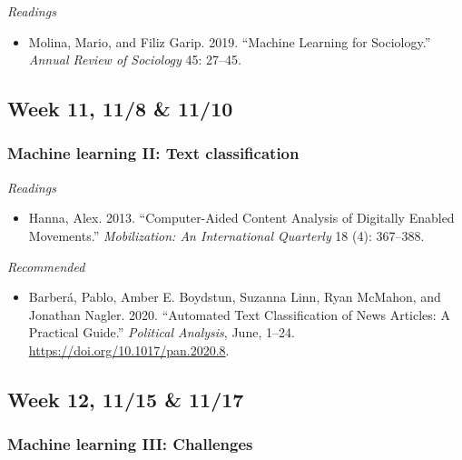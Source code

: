 \documentclass[
  10pt,
]{article}
\providecommand{\tightlist}{%
  \setlength{\itemsep}{0pt}\setlength{\parskip}{0pt}}
\begin{document}
\emph{Readings}

\begin{itemize}
\tightlist
\item
  Molina, Mario, and Filiz Garip. 2019. ``Machine Learning for
  Sociology.'' \emph{Annual Review of Sociology} 45: 27--45.
\end{itemize}

\hypertarget{week-11-118-1110}{%
\subsection{Week 11, 11/8 \& 11/10}\label{week-11-118-1110}}

\hypertarget{machine-learning-ii-text-classification}{%
\subsubsection{Machine learning II: Text
classification}\label{machine-learning-ii-text-classification}}

\emph{Readings}

\begin{itemize}
\tightlist
\item
  Hanna, Alex. 2013. ``Computer-Aided Content Analysis of Digitally
  Enabled Movements.'' \emph{Mobilization: An International Quarterly}
  18 (4): 367--388.
\end{itemize}

\emph{Recommended}

\begin{itemize}
\tightlist
\item
  Barberá, Pablo, Amber E. Boydstun, Suzanna Linn, Ryan McMahon, and
  Jonathan Nagler. 2020. ``Automated Text Classification of News
  Articles: A Practical Guide.'' \emph{Political Analysis}, June, 1--24.
  \url{https://doi.org/10.1017/pan.2020.8}.
\end{itemize}

\hypertarget{week-12-1115-1117}{%
\subsection{Week 12, 11/15 \& 11/17}\label{week-12-1115-1117}}

\hypertarget{machine-learning-iii-challenges}{%
\subsubsection{Machine learning III:
Challenges}\label{machine-learning-iii-challenges}}
\end{document}
